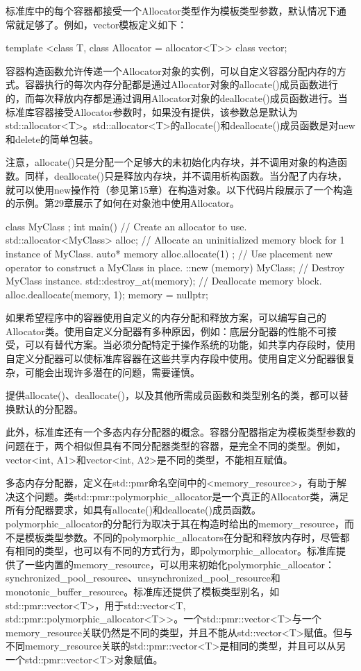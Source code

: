 标准库中的每个容器都接受一个Allocator类型作为模板类型参数，默认情况下通常就足够了。例如，vector模板定义如下：

\begin{cpp}
template <class T, class Allocator = allocator<T>> class vector;
\end{cpp}

容器构造函数允许传递一个Allocator对象的实例，可以自定义容器分配内存的方式。容器执行的每次内存分配都是通过Allocator对象的allocate()成员函数进行的，而每次释放内存都是通过调用Allocator对象的deallocate()成员函数进行。当标准库容器接受Allocator参数时，如果没有提供，该参数总是默认为std::allocator<T>。std::allocator<T>的allocate()和deallocate()成员函数是对new和delete的简单包装。

注意，allocate()只是分配一个足够大的未初始化内存块，并不调用对象的构造函数。同样，deallocate()只是释放内存块，并不调用析构函数。当分配了内存块，就可以使用new操作符（参见第15章）在构造对象。以下代码片段展示了一个构造的示例。第29章展示了如何在对象池中使用Allocator。

\begin{cpp}
class MyClass {};
int main()
{
    // Create an allocator to use.
    std::allocator<MyClass> alloc;
    // Allocate an uninitialized memory block for 1 instance of MyClass.
    auto* memory { alloc.allocate(1) };
    // Use placement new operator to construct a MyClass in place.
    ::new (memory) MyClass{};
    // Destroy MyClass instance.
    std::destroy_at(memory);
    // Deallocate memory block.
    alloc.deallocate(memory, 1);
    memory = nullptr;
}
\end{cpp}

如果希望程序中的容器使用自定义的内存分配和释放方案，可以编写自己的Allocator类。使用自定义分配器有多种原因，例如：底层分配器的性能不可接受，可以有替代方案。当必须分配特定于操作系统的功能，如共享内存段时，使用自定义分配器可以使标准库容器在这些共享内存段中使用。使用自定义分配器很复杂，可能会出现许多潜在的问题，需要谨慎。

提供allocate()、deallocate()，以及其他所需成员函数和类型别名的类，都可以替换默认的分配器。

此外，标准库还有一个多态内存分配器的概念。容器分配器指定为模板类型参数的问题在于，两个相似但具有不同分配器类型的容器，是完全不同的类型。例如，vector<int, A1>和vector<int, A2>是不同的类型，不能相互赋值。

多态内存分配器，定义在std::pmr命名空间中的<memory\_resource>，有助于解决这个问题。类std::pmr::polymorphic\_allocator是一个真正的Allocator类，满足所有分配器要求，如具有allocate()和deallocate()成员函数。polymorphic\_allocator的分配行为取决于其在构造时给出的memory\_resource，而不是模板类型参数。不同的polymorphic\_allocators在分配和释放内存时，尽管都有相同的类型，也可以有不同的方式行为，即polymorphic\_allocator。标准库提供了一些内置的memory\_resource，可以用来初始化polymorphic\_allocator：synchronized\_pool\_resource、unsynchronized\_pool\_resource和monotonic\_buffer\_resource。标准库还提供了模板类型别名，如std::pmr::vector<T>，用于std::vector<T, std::pmr::polymorphic\_allocator<T>>。一个std::pmr::vector<T>与一个memory\_resource关联仍然是不同的类型，并且不能从std::vector<T>赋值。但与不同memory\_resource关联的std::pmr::vector<T>是相同的类型，并且可以从另一个std::pmr::vector<T>对象赋值。


